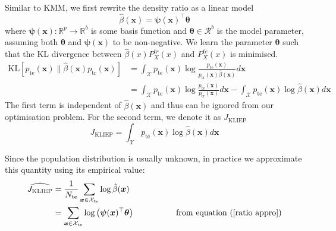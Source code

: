 \documentclass[a4paper,12pt]{article}
\begin{document}
Similar to KMM, we first rewrite the density ratio as a linear model 
\begin{equation} \label{ratio appro}
\hat{\beta}(\boldsymbol{x})=\boldsymbol{\psi}(\boldsymbol{x})^{\top} \boldsymbol{\theta}
\end{equation}
where $\boldsymbol{\psi}(\boldsymbol{x}): \mathbb{R}^{p} \rightarrow \mathbb{R}^{b}$ is some basis function and $\boldsymbol{\theta} \in \mathcal{R}^{b}$ is the model parameter, assuming both $\boldsymbol{\theta}$ and $\boldsymbol{\psi}(\boldsymbol{x})$ to be non-negative.
We learn the parameter $\boldsymbol{\theta}$ such that the KL divergence between $\hat{\beta}(x){P^{tr}_{X}(x)}$ and $P^{te}_{X}(x)$ is minimised.
\begin{align*}
\mathrm{KL}\left[p_{\mathrm{te}}(\boldsymbol{x}) \| \hat{\beta}(\boldsymbol{x})p_{\mathrm{tr}}(\boldsymbol{x})\right] &=\int_{\mathcal{X}} p_{\mathrm{te}}(\boldsymbol{x}) \log \frac{p_{\mathrm{te}}(\boldsymbol{x})}{p_{\mathrm{tr}}(\boldsymbol{x}) \hat{\beta}(\boldsymbol{x})} d \boldsymbol{x} \\
&=\int_{\mathcal{X}} p_{\mathrm{te}}(\boldsymbol{x}) \log \frac{p_{\mathrm{te}}(\boldsymbol{x})}{p_{\mathrm{tr}}(\boldsymbol{x})} d \boldsymbol{x}-\int_{\mathcal{X}} p_{\mathrm{te}}(\boldsymbol{x}) \log \hat{\beta}(\boldsymbol{x}) d \boldsymbol{x}
\end{align*}
The first term is independent of $\hat{\beta}(\boldsymbol{x})$ and thus can be ignored from our optimisation problem. For the second term, we denote it as $J_{\mathrm{KLIEP}}$ 
\begin{equation*} 
J_{\mathrm{KLIEP}}=\int_{\mathcal{X}} p_{\mathrm{te}}(\boldsymbol{x}) \log \hat{\beta}(\boldsymbol{x}) d \boldsymbol{x}
\end{equation*}

Since the population distribution is usually unknown, in practice we approximate this quantity using its empirical value:
\begin{align} \label{kliep_obj}
\widehat{J_{\mathrm{KLIEP}}} &= \frac{1}{N_{\mathrm{te}}} \sum_{\boldsymbol{x} \in \mathcal{X}_{\mathrm{te}}} \log \hat{\beta}(\boldsymbol{x})\\
& = \sum_{\boldsymbol{x} \in \mathcal{X}_{\mathrm{te}}} \log \left(\boldsymbol{\psi}(\boldsymbol{x})^{\top} \boldsymbol{\theta} \right) \hspace{50pt} \text{from equation (\ref{ratio appro})}
\end{align}
\end{document}
